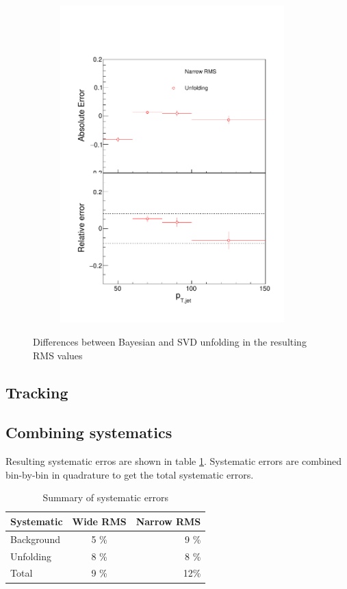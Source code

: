 \begin{figure}
\begin{subfigure}{0.24\textwidth}
\includegraphics[width=0.95\textwidth]{results/SystematicErrors/SystematicErrorsGausRMS_UnfNFin00JetPt08_linx_data}
\end{subfigure}
\caption{Differences between Bayesian and SVD unfolding in the resulting RMS values}
\label{fig:systunf}
\end{figure}

\subsection{Tracking}

\subsection{Combining systematics}
Resulting systematic erros are shown in table \ref{tab:systematics}. Systematic errors are combined bin-by-bin in quadrature to get the total systematic errors.
\begin{table}[htb]
\centering
\caption{Summary of systematic errors}
\label{tab:systematics}
\begin{tabular}{ l | c | r }
  Systematic & Wide RMS & Narrow RMS \\
    \hline			
  Background & 5 \% & 9 \% \\
  Unfolding & 8 \% & 8 \% \\
  Total & 9 \% & 12\% \\
  \hline
  \end{tabular}
  \end{table}